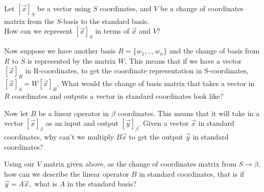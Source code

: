   \begin{enumerate}[resume]
  \qitem Let $[\vec{x}]_S$ be a vector using $S$ coordinates, and $V$ be a change of coordinates matrix from the $S$-basis to the standard basis. \\
  How can we represent $[\vec{x}]_S$ in terms of $\vec{x}$ and $V?$

  \qitem Now suppose we have another basis $R = \{w_1, .. , w_n\}$ and the change of basis from $R$ to $S$ is represented by the matrix $W.$ This means that if we have a vector $[\vec{x}]_R$ in R-coordinates, to get the coordinate representation in S-coordinates, $[\vec{x}]_S = W[\vec{x}]_R.$ What would the change of basis matrix that takes a vector in $R$ coordinates and outputs a vector in standard coordinates look like?

  \qitem Now let $B$ be a linear operator in $\beta$ coordinates. This means that it will take in a vector $[\vec{x}]_\beta$ as an input and output $[\vec{y}]_\beta.$ Given a vector $\vec{x}$ in standard coordinates, why can't we multiply $B \vec{x}$ to get the output $\vec{y}$ in standard coordinates?


  \qitem Using our $V$ matrix given above, as the change of coordinates matrix from $S \to \beta,$ how can we describe the linear operator $B$ in standard coordinates, that is if $\vec{y} = A \vec{x},$ what is $A$ in the standard basis?


\end{enumerate}
